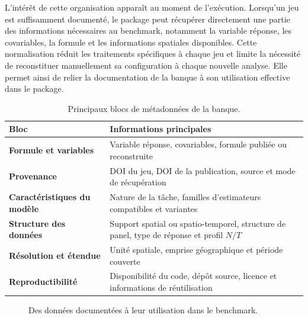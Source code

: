 \documentclass[11pt,a4paper]{article}
\begin{document}
L'intérêt de cette organisation apparaît au moment de l'exécution. Lorsqu'un jeu est suffisamment documenté, le package peut récupérer directement une partie des informations nécessaires au benchmark, notamment la variable réponse, les covariables, la formule et les informations spatiales disponibles. Cette normalisation réduit les traitements spécifiques à chaque jeu et limite la nécessité de reconstituer manuellement sa configuration à chaque nouvelle analyse. Elle permet ainsi de relier la documentation de la banque à son utilisation effective dans le package.
\newpage
\begin{table}[h]
\centering
\small
\begin{tabularx}{\textwidth}{>{\bfseries}p{4.1cm} X}
\toprule
Bloc & Informations principales \\
\midrule
Formule et variables &
Variable réponse, covariables, formule publiée ou reconstruite \\

Provenance &
DOI du jeu, DOI de la publication, source et mode de récupération \\

Caractéristiques du modèle &
Nature de la tâche, familles d'estimateurs compatibles et variantes \\

Structure des données &
Support spatial ou spatio-temporel, structure de panel, type de réponse et profil $N/T$ \\

Résolution et étendue &
Unité spatiale, emprise géographique et période couverte \\

Reproductibilité &
Disponibilité du code, dépôt source, licence et informations de réutilisation \\
\bottomrule
\end{tabularx}

\caption{Principaux blocs de métadonnées de la banque.}
\label{tab:metadata-blocks}
\end{table}
\begin{figure}[h]
\centering
{}
\caption{Des données documentées à leur utilisation dans le benchmark.}

\label{fig:chaine-methodologique}
\end{figure}
\end{document}
